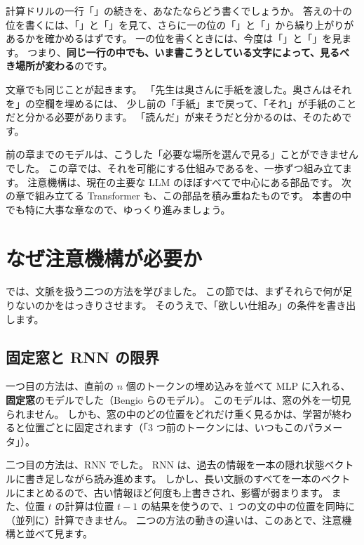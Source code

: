計算ドリルの一行「」の続きを、あなたならどう書くでしょうか。
答えの十の位を書くには、「」と「」を見て、さらに一の位の「」と「」から繰り上がりがあるかを確かめるはずです。
一の位を書くときには、今度は「」と「」を見ます。
つまり、\textbf{同じ一行の中でも、いま書こうとしている文字によって、見るべき場所が変わる}のです。

文章でも同じことが起きます。
「先生は奥さんに手紙を渡した。奥さんはそれを\underline{\hspace{2em}}」の空欄を埋めるには、
少し前の「手紙」まで戻って、「それ」が手紙のことだと分かる必要があります。
「読んだ」が来そうだと分かるのは、そのためです。

前の章までのモデルは、こうした「必要な場所を選んで見る」ことができませんでした。
この章では、それを可能にする仕組みであるを、一歩ずつ組み立てます。
注意機構は、現在の主要な LLM のほぼすべてで中心にある部品です。
次の章で組み立てる Transformer も、この部品を積み重ねたものです。
本書の中でも特に大事な章なので、ゆっくり進みましょう。

\section{なぜ注意機構が必要か}\label{sec:attn-why}

では、文脈を扱う二つの方法を学びました。
この節では、まずそれらで何が足りないのかをはっきりさせます。
そのうえで、「欲しい仕組み」の条件を書き出します。

\subsection*{固定窓と RNN の限界}

一つ目の方法は、直前の $n$ 個のトークンの埋め込みを並べて MLP に入れる、\textbf{固定窓}のモデルでした（Bengio らのモデル\cite{bengio2003neural}）。
このモデルは、窓の外を一切見られません。
しかも、窓の中のどの位置をどれだけ重く見るかは、学習が終わると位置ごとに固定されます（「3 つ前のトークンには、いつもこのパラメータ」）。

二つ目の方法は、RNN でした。
RNN は、過去の情報を一本の隠れ状態ベクトルに書き足しながら読み進めます。
しかし、長い文脈のすべてを一本のベクトルにまとめるので、古い情報ほど何度も上書きされ、影響が弱まります。
また、位置 $t$ の計算は位置 $t-1$ の結果を使うので、1 つの文の中の位置を同時に（並列に）計算できません。
二つの方法の動きの違いは、このあとで、注意機構と並べて見ます。

